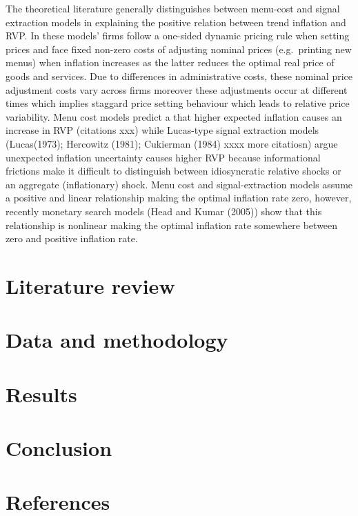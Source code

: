 \documentclass[
  letterpaper,
  DIV=11,
  numbers=noendperiod]{scrartcl}
\begin{document}
The theoretical literature generally distinguishes between menu-cost and
signal extraction models in explaining the positive relation between
trend inflation and RVP. In these models' firms follow a one-sided
dynamic pricing rule when setting prices and face fixed non-zero costs
of adjusting nominal prices (e.g.~printing new menus) when inflation
increases as the latter reduces the optimal real price of goods and
services. Due to differences in administrative costs, these nominal
price adjustment costs vary across firms moreover these adjustments
occur at different times which implies staggard price setting behaviour
which leads to relative price variability. Menu cost models predict a
that higher expected inflation causes an increase in RVP (citations xxx)
while Lucas-type signal extraction models (Lucas(1973); Hercowitz
(1981); Cukierman (1984) xxxx more citatiosn) argue unexpected inflation
uncertainty causes higher RVP because informational frictions make it
difficult to distinguish between idiosyncratic relative shocks or an
aggregate (inflationary) shock. Menu cost and signal-extraction models
assume a positive and linear relationship making the optimal inflation
rate zero, however, recently monetary search models (Head and Kumar
(2005)) show that this relationship is nonlinear making the optimal
inflation rate somewhere between zero and positive inflation rate.

\section{Literature review}\label{literature-review}

\section{Data and methodology}\label{data-and-methodology}

\section{Results}\label{results}

\section{Conclusion}\label{conclusion}

\newpage

\section*{References}\label{references}
\end{document}

